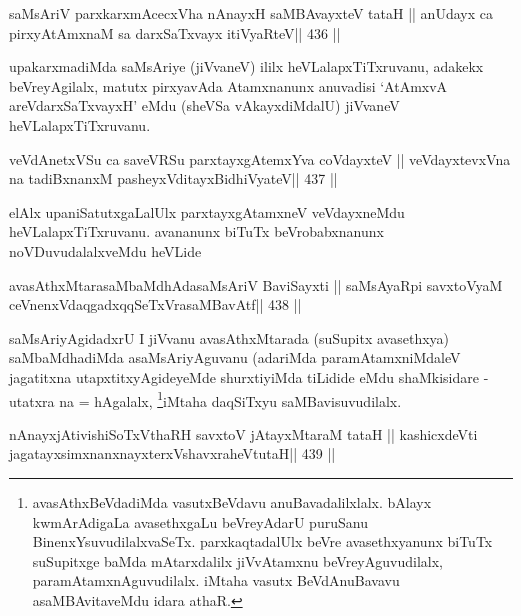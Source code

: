 \begin{shl}
saMsAriV parxkarxmAcecxVha nAnayxH saMBAvayxteV tataH ||
anUdayx ca pirxyAtAmxnaM sa darxSaTxvayx itiVyaRteV\hfill || 436 ||
\end{shl}


\begin{artha}
upakarxmadiMda saMsAriye (jiVvaneV) ililx heVLalapxTiTxruvanu, adakekx
beVreyAgilalx, matutx pirxyavAda Atamxnanunx anuvadisi `AtAmxvA
areVdarxSaTxvayxH' eMdu (sheVSa vAkayxdiMdalU) jiVvaneV
heVLalapxTiTxruvanu.
\end{artha}


\begin{shl}
veVdAnetxVSu ca saveVRSu parxtayxgAtemxYva coVdayxteV ||
veVdayxtevxVna na tadiBxnanxM pasheyxVditayxBidhiVyateV\hfill || 437 ||
\end{shl}

\begin{artha}
elAlx upaniSatutxgaLalUlx parxtayxgAtamxneV veVdayxneMdu
heVLalapxTiTxruvanu. avananunx biTuTx beVrobabxnanunx
noVDuvudalalxveMdu heVLide
\end{artha}


\begin{shl}
avasAthxMtarasaMbaMdhAdasaMsAriV BaviSayxti ||
saMsAyaRpi savxtoV\s yaM ceVnenxVdaqgadxqqSeTxVrasaMBavAtf\hfill || 438 ||
\end{shl}

\begin{artha}
saMsAriyAgidadxrU I jiVvanu avasAthxMtarada (suSupitx avasethxya)
saMbaMdhadiMda asaMsAriyAguvanu (adariMda paramAtamxniMdaleV
jagatitxna utapxtitxyAgideyeMde shurxtiyiMda tiLidide eMdu
shaMkisidare - utatxra na = hAgalalx, \footnote[1]{avasAthxBeVdadiMda 
vasutxBeVdavu anuBavadalilxlalx. bAlayx
kwmArAdigaLa avasethxgaLu beVreyAdarU puruSanu
BinenxYsuvudilalxvaSeTx. parxkaqtadalUlx beVre avasethxyanunx biTuTx
suSupitxge baMda mAtarxdalilx jiVvAtamxnu beVreyAguvudilalx,
paramAtamxnAguvudilalx. iMtaha vasutx BeVdAnuBavavu asaMBAvitaveMdu
idara athaR.}iMtaha daqSiTxyu saMBavisuvudilalx.
\end{artha}



\begin{shl}
nAnayxjAtivishiSoTxV\s thaRH savxtoV jAtayxMtaraM tataH ||
kashicxdeVti jagatayxsimxnanxnayxterxVshavxraheVtutaH\hfill || 439 ||
\end{shl}

